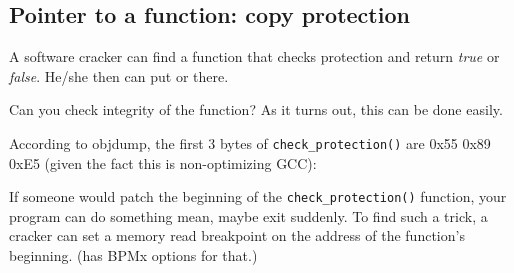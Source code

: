 \subsection{Pointer to a function: copy protection}
\myindex{\SoftwareCracking}

A software cracker can find a function that checks protection and return \emph{true} or \emph{false}.
He/she then can put  or  there.

Can you check integrity of the function?
As it turns out, this can be done easily.

According to objdump, the first 3 bytes of \verb|check_protection()| are 0x55 0x89 0xE5 (given the fact this is non-optimizing GCC):





If someone would patch the beginning of the \verb|check_protection()| function,
your program can do something mean, maybe exit suddenly.
To find such a trick, a cracker can set a memory read breakpoint on the address of the function's beginning.
(\tracer has BPMx options for that.)

